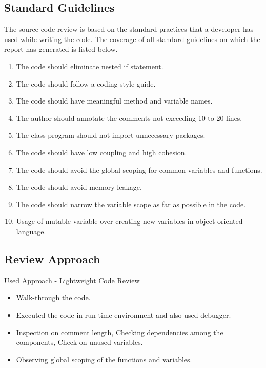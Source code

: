 \documentclass[a4paper,12pt]{article}
\begin{document}
    \subsection{Standard Guidelines}
   The source code review is based on the standard practices that a developer has used while writing the code. The coverage of all standard guidelines on which the report has generated is listed below.
   \begin{enumerate}
        \item The code should eliminate nested if statement.
       \item The code should follow a coding style guide.
       \item The code should have meaningful method and variable names.
       \item The author should annotate the comments not exceeding 10 to 20 lines.
       \item The class program should not import unnecessary packages.
       \item The code should have low coupling and high cohesion.
       \item The code should avoid the global scoping for common variables and functions.
       \item The code should avoid memory leakage.
       \item The code should narrow the variable scope as far as possible in the code.
       \item Usage of mutable variable over creating new variables in object oriented language.
   \end{enumerate}
   
    \subsection{Review Approach}
    Used Approach - Lightweight Code Review
    \begin{itemize}
        \item Walk-through the code.
        \item Executed the code in run time environment and also used debugger.
        \item Inspection on comment length, Checking dependencies among the components, Check on unused variables.
        \item Observing global scoping of the functions and variables.
    \end{itemize}
    
\end{document}
